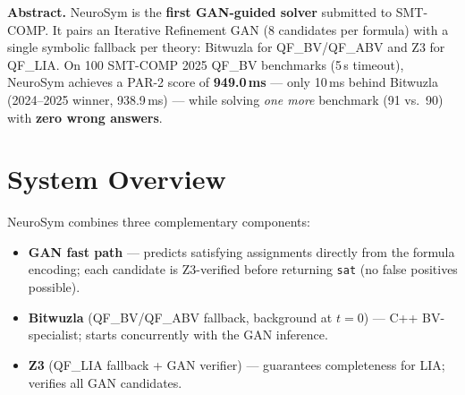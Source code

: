 \documentclass[10pt,twocolumn]{article}
\begin{document}


\noindent
\textbf{Abstract.}
NeuroSym is the \textbf{first GAN-guided solver} submitted to SMT-COMP.
It pairs an Iterative Refinement GAN (8 candidates per formula) with a
single symbolic fallback per theory: Bitwuzla for QF\_BV/QF\_ABV and
Z3 for QF\_LIA.
On 100 SMT-COMP 2025 QF\_BV benchmarks (5\,s timeout),
NeuroSym achieves a PAR-2 score of \textbf{949.0\,ms} — only 10\,ms
behind Bitwuzla (2024--2025 winner, 938.9\,ms) — while solving \emph{one more}
benchmark (91 vs.\ 90) with \textbf{zero wrong answers}.

\section{System Overview}

NeuroSym combines three complementary components:
\begin{itemize}
  \item \textbf{GAN fast path} — predicts satisfying assignments directly
        from the formula encoding; each candidate is Z3-verified before
        returning \texttt{sat} (no false positives possible).
  \item \textbf{Bitwuzla} (QF\_BV/QF\_ABV fallback, background at $t{=}0$) —
        C++ BV-specialist; starts concurrently with the GAN inference.
  \item \textbf{Z3} (QF\_LIA fallback + GAN verifier) — guarantees
        completeness for LIA; verifies all GAN candidates.
\end{itemize}
\end{document}
